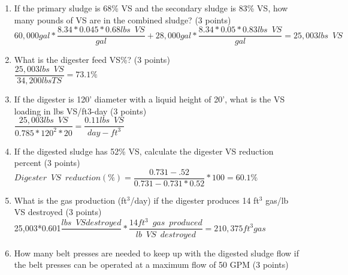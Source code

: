 \documentclass{article}
\begin{document}
\begin{enumerate}
\begin{enumerate}
\item If the primary sludge is 68\% VS and the secondary sludge is 83\% VS, how many pounds of VS are in the combined sludge? (3 points)\\
$60,000 gal *\dfrac{8.34*0.045*0.68lbs \enspace VS}{gal}+28,000 gal *\dfrac{8.34*0.05*0.83lbs \enspace VS}{gal}=\boxed{25,003 lbs \enspace VS}$
\vspace{2cm}

\item What is the digester feed VS\%?  (3 points)\\
$\dfrac{25,003 lbs \enspace VS}{34,200 lbs TS}=\boxed{73.1\%}$

\vspace{2cm}



\item If the digester is 120’ diameter with a liquid height of 20’, what is the VS loading in lbs VS/ft3-day (3 points)\\

$\dfrac{25,003 lbs \enspace VS}{0.785*120^2*20}=\boxed{\dfrac{0.11 lbs \enspace VS}{day-ft^3}}$\\
\vspace{2cm}





\item If the digested sludge has 52\% VS, calculate the digester VS reduction percent (3 points)\\

$
Digester \enspace VS \enspace reduction (\%)=
	\dfrac
	{0.731 - .52}
	{0.731 - 0.731 *0.52}
	*100=\boxed{60.1\%}
$\\
\vspace{2cm}

\item What is the gas production (ft$^3$/day) if the digester produces 14 ft$^3$ gas/lb VS destroyed (3 points)\\
25,003*0.601$\dfrac{lbs\enspace VS destroyed}{}*\dfrac{14ft^3 \enspace gas \enspace produced}{lb \enspace VS \enspace destroyed}=\boxed{210,375ft^3 gas}$
\\
\vspace{2cm}

\item How many belt presses are needed to keep up with the digested sludge flow if the belt presses can be operated at a maximum flow of 50 GPM (3 points)\\


\end{enumerate}
\end{enumerate}
\end{document}
